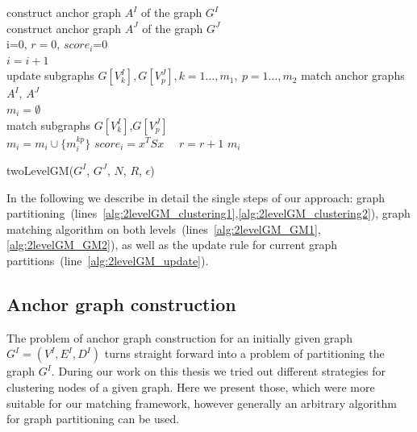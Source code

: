 \begin{algorithm}[h]
	construct anchor graph $A^I$ of the graph $G^I$ \label{alg:2levelGM_clustering1}\\
	construct anchor graph $A^J$ of the graph $G^J$ \label{alg:2levelGM_clustering2}\\
	i=0, $r=0$, $score_i$=0\\
	{ $i=i+1$ \\
	  {update subgraphs $G[V^I_k],G[V^J_p],k=1\dots,m_1,\ p=1\dots,m_2$ \label{alg:2levelGM_update}}
	  match anchor graphs $A^I$, $A^J$ \label{alg:2levelGM_GM1} \\
	  $m_i=\emptyset$\\
	  {match subgraphs $G[V^I_k]$,$G[V^J_p]$ \label{alg:2levelGM_GM2}\\
	   $m_i=m_i\cup\{m^{kp}_i\}$\hspace{50pt}
	  }
	  $score_i=x^TSx$\ \ 
	  {$r=r+1$}
	}
	\Return $m_i$
	\caption{twoLevelGM($G^I$, $G^J$, $N$, $R$, $\epsilon$)} \label{alg:2levelGM}
\end{algorithm}

In the following we describe in detail the single steps of our approach: %
graph partitioning~(lines~\ref{alg:2levelGM_clustering1},\ref{alg:2levelGM_clustering2}), graph matching algorithm on both levels~(lines~\ref{alg:2levelGM_GM1},\ref{alg:2levelGM_GM2}), as well as the update rule for current graph partitions~(line~\ref{alg:2levelGM_update}).
\subsection{Anchor graph construction} \label{subgraphInit}
The problem of anchor graph construction for an initially given graph $G^I=(V^I,E^I,D^I)$ turns straight forward into a problem of partitioning the graph $G^I$. During our work on this thesis we tried out different strategies for clustering nodes of a given graph. Here we present those, which were more suitable for our matching framework, however generally an arbitrary algorithm for graph partitioning can be used.

